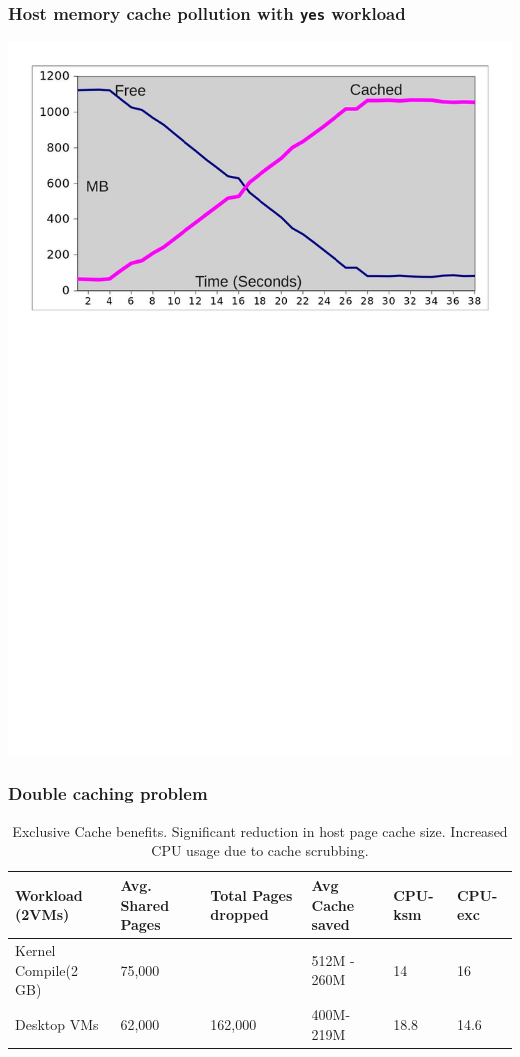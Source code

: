 \documentclass{beamer}
\begin{document}
\begin{frame}
\frametitle{Host memory cache pollution with \texttt{yes} workload}
  \includegraphics[scale=0.55]{yes2.pdf}
\end{frame}

\begin{frame}
  \frametitle{Double caching problem}
\begin{table}
\begin{center}
\begin{tabular}{|p{2cm}|p{1.6cm}|p{1.6cm}|p{2.0cm}|p{1cm}|p{1cm}|}
\hline
 \small{Workload  (2VMs)}      &  Avg. Shared Pages  &  Total Pages dropped  &  Avg Cache saved  &  CPU-ksm  &  CPU-exc  \\
\hline
\small{Kernel Compile(2 GB)}  &  75,000             &                       &  \small{512M - 260M}      &       14  &       16  \\
\small{Desktop VMs}        &  62,000             &  162,000              &  \small{400M- 219M}       &     18.8  &     14.6  \\
\hline
\end{tabular}
\caption{Exclusive Cache benefits. Significant reduction in host page cache size. Increased CPU usage due to cache scrubbing.}
\end{center}
\end{table}
\end{frame}
\end{document}
